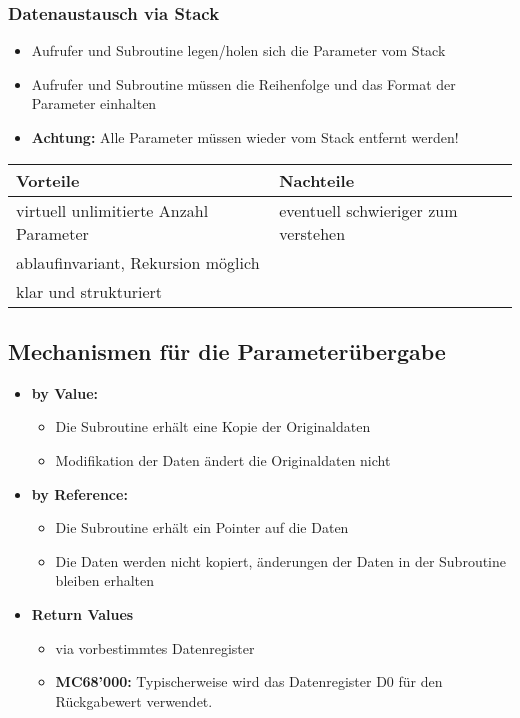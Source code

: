 \subsubsection{Datenaustausch via Stack}
\begin{itemize}
  \item Aufrufer und Subroutine legen/holen sich die Parameter vom Stack
  \item Aufrufer und Subroutine müssen die Reihenfolge und das Format der Parameter einhalten
  \item \textbf{Achtung:} Alle Parameter müssen wieder vom Stack entfernt werden!
\end{itemize}
\begin{tabular}{l|l}
	\textbf{Vorteile} 	& \textbf{Nachteile} \\
	\hline
	virtuell unlimitierte Anzahl Parameter	& eventuell schwieriger zum verstehen \\
	ablaufinvariant, Rekursion möglich 		& \\
	klar und strukturiert					&
\end{tabular}


\subsection{Mechanismen für die Parameterübergabe}
\begin{itemize}
  \item \textbf{by Value:}
  	\begin{itemize}
  		\item Die Subroutine erhält eine Kopie der Originaldaten
  		\item Modifikation der Daten ändert die Originaldaten nicht
	\end{itemize}
  \item \textbf{by Reference:}
  	\begin{itemize}
  		\item Die Subroutine erhält ein Pointer auf die Daten
  		\item Die Daten werden nicht kopiert, änderungen der Daten in der Subroutine bleiben erhalten
	\end{itemize}
  \item \textbf{Return Values}
  	\begin{itemize}
  		\item via vorbestimmtes Datenregister
  		\item \textbf{MC68'000:} Typischerweise wird das Datenregister D0 für den Rückgabewert verwendet.
	\end{itemize}
\end{itemize}


